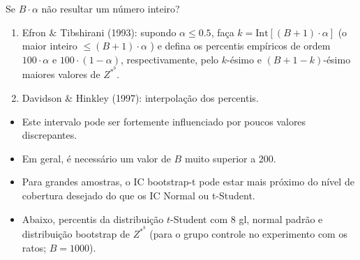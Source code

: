 \documentclass[
  letterpaper,
  DIV=11,
  numbers=noendperiod]{scrreprt}
\begin{document}
\begin{tcolorbox}[enhanced jigsaw, coltitle=black, bottomtitle=1mm, toprule=.15mm, arc=.35mm, colframe=quarto-callout-important-color-frame, breakable, opacityback=0, bottomrule=.15mm, rightrule=.15mm, titlerule=0mm, toptitle=1mm, title=\textcolor{quarto-callout-important-color}{\faExclamation}\hspace{0.5em}{Importante}, leftrule=.75mm, opacitybacktitle=0.6, left=2mm, colback=white, colbacktitle=quarto-callout-important-color!10!white]

Se \(B\cdot\alpha\) não resultar um número inteiro?

\begin{enumerate}
\def\labelenumi{\arabic{enumi}.}
\item
  Efron \(\&\) Tibshirani (1993): supondo \(\alpha \leq 0.5\), faça
  \(k=\mbox{Int}[(B+1)\cdot\alpha]\) (o maior inteiro
  \(\leq (B+1)\cdot\alpha\) ) e defina os percentis empíricos de ordem
  \(100\cdot\alpha\) e \(100\cdot(1-\alpha)\), respectivamente, pelo
  \(k\)-ésimo e \((B+1-k)\)-ésimo maiores valores de \(Z^{*^b}\).
\item
  Davidson \(\&\) Hinkley (1997): interpolação dos percentis.
\end{enumerate}

\end{tcolorbox}

\begin{tcolorbox}[enhanced jigsaw, coltitle=black, bottomtitle=1mm, toprule=.15mm, arc=.35mm, colframe=quarto-callout-note-color-frame, breakable, opacityback=0, bottomrule=.15mm, rightrule=.15mm, titlerule=0mm, toptitle=1mm, title=\textcolor{quarto-callout-note-color}{\faInfo}\hspace{0.5em}{Considerações}, leftrule=.75mm, opacitybacktitle=0.6, left=2mm, colback=white, colbacktitle=quarto-callout-note-color!10!white]

\begin{itemize}
\item
  Este intervalo pode ser fortemente influenciado por poucos valores
  discrepantes.
\item
  Em geral, é necessário um valor de \(B\) muito superior a 200.
\item
  Para grandes amostras, o IC bootstrap-t pode estar mais próximo do
  nível de cobertura desejado do que os IC Normal ou t-Student.
\item
  Abaixo, percentis da distribuição \(t\)-Student com 8 gl, normal
  padrão e distribuição bootstrap de \(Z^{*^b}\) (para o grupo controle
  no experimento com os ratos; \(B=1000\)).
\end{itemize}

\end{tcolorbox}
\end{document}
